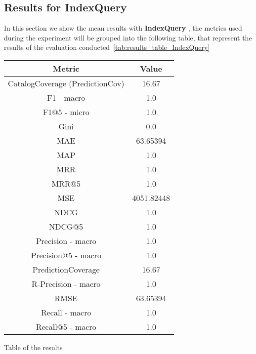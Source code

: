 \documentclass[11pt]{article}
\begin{document}
\hfill\break
\hfill\break



\subsection{Results for IndexQuery}\label{subsec:IndexQuery}
In this section we show the mean results with \textbf{ IndexQuery }, the metrics used during the experiment will be
grouped into the following table, that represent the results of the evaluation conducted~\ref{tab:results_table_IndexQuery}

\begin{center}
    \begin{tabular}{|c|c|}
        \hline
        \textbf{Metric} & \textbf{Value} \\ \hline
                CatalogCoverage (PredictionCov) & 16.67 \\ \hline
                F1 - macro & 1.0 \\ \hline
                F1@5 - micro & 1.0 \\ \hline
                Gini & 0.0 \\ \hline
                MAE & 63.65394 \\ \hline
                MAP & 1.0 \\ \hline
                MRR & 1.0 \\ \hline
                MRR@5 & 1.0 \\ \hline
                MSE & 4051.82448 \\ \hline
                NDCG & 1.0 \\ \hline
                NDCG@5 & 1.0 \\ \hline
                Precision - macro & 1.0 \\ \hline
                Precision@5 - macro & 1.0 \\ \hline
                PredictionCoverage & 16.67 \\ \hline
                R-Precision - macro & 1.0 \\ \hline
                RMSE & 63.65394 \\ \hline
                Recall - macro & 1.0 \\ \hline
                Recall@5 - macro & 1.0 \\ \hline
             \end{tabular}
    \captionsetup{type=table}
    \caption{Table of the results}
    \label{tab:results_table_IndexQuery}
\end{center}
\hfill\break
\hfill\break
\end{document}
